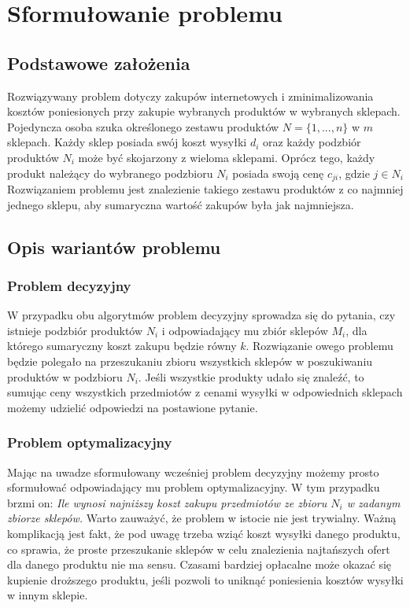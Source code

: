 \documentclass[a4paper]{article}
\let\oldsection\section
\renewcommand\section{\clearpage\oldsection}
\begin{document}
\section{Sformułowanie problemu}
\subsection{Podstawowe założenia}
\large
Rozwiązywany problem dotyczy zakupów internetowych i zminimalizowania kosztów poniesionych przy zakupie wybranych produktów w wybranych sklepach. Pojedyncza osoba szuka określonego zestawu produktów $N = \{1,...,n\}$ w $m$ sklepach. Każdy sklep posiada swój koszt wysyłki $d_i$ oraz każdy podzbiór produktów $N_i$ może być skojarzony z wieloma sklepami. Oprócz tego, każdy produkt należący do wybranego podzbioru $N_i$ posiada swoją cenę $c_{ji}$, gdzie $j \in N_i$ Rozwiązaniem problemu jest znalezienie takiego zestawu produktów z co najmniej jednego sklepu, aby sumaryczna wartość zakupów była jak najmniejsza.
\subsection{Opis wariantów problemu}
\subsubsection{Problem decyzyjny}
W przypadku obu algorytmów problem decyzyjny sprowadza się do pytania, czy istnieje podzbiór produktów $N_i$ i odpowiadający mu zbiór sklepów $M_i$, dla którego sumaryczny koszt zakupu będzie równy $k$. Rozwiązanie owego problemu będzie polegało na przeszukaniu zbioru wszystkich sklepów w poszukiwaniu produktów w podzbioru $N_i$. Jeśli wszystkie produkty udało się znaleźć, to sumując ceny wszystkich przedmiotów z cenami wysyłki w odpowiednich sklepach możemy udzielić odpowiedzi na postawione pytanie.
\subsubsection{Problem optymalizacyjny}
Mając na uwadze sformułowany wcześniej problem decyzyjny możemy prosto sformułować odpowiadający mu problem optymalizacyjny. W tym przypadku brzmi on: \textit{Ile wynosi najniższy koszt zakupu przedmiotów ze zbioru $N_i$ w zadanym zbiorze sklepów.} Warto zauważyć, że problem w istocie nie jest trywialny. Ważną komplikacją jest fakt, że pod uwagę trzeba wziąć koszt wysyłki danego produktu, co sprawia, że proste przeszukanie sklepów w celu znalezienia najtańszych ofert dla danego produktu nie ma sensu. Czasami bardziej opłacalne może okazać się kupienie droższego produktu, jeśli pozwoli to uniknąć poniesienia kosztów wysyłki w innym sklepie. 
\end{document}
